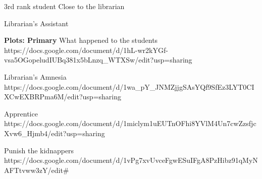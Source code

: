 \documentclass[char]{GL2020}
\begin{document}
\name{\cLibAssist{}}








3rd rank student	Close to the librarian

Librarian's Assistant

\textbf{Plots: Primary}
What happened to the students
https://docs.google.com/document/d/1hL-wr2kYGf-vsa5OGopeludIUBq381x5bLnzq_WTXSw/edit?usp=sharing

Librarian's Amnesia
https://docs.google.com/document/d/1wa_pY_JNMZjjgSAsYQf9SfEz3LYT0CIXCwEXBRPma6M/edit?usp=sharing

Apprentice
https://docs.google.com/document/d/1miclym1uEUTnOFhi8YVlM4Un7cwZzsfjcXvw6_Hjmb4/edit?usp=sharing

Punish the kidnappers
https://docs.google.com/document/d/1vPg7xvUvceFgwESuIFgA8PzHibz91qMyNAFTtvww3zY/edit#
\end{document}
